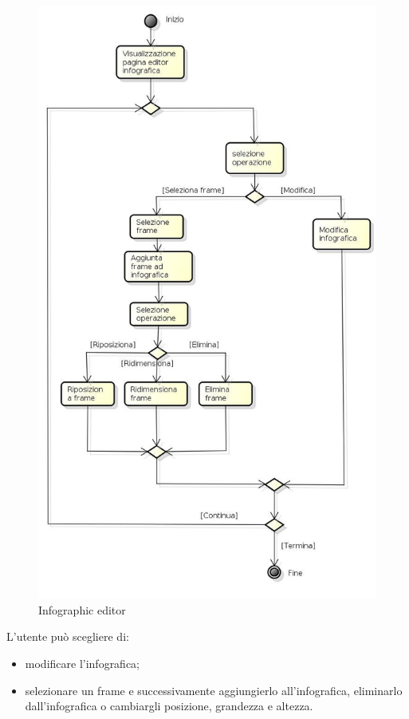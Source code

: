 \begin{figure}[h!]
		\centering
		\includegraphics[scale=.4]{img/Editor_infografica.jpg}
		\caption{Infographic editor}
		\label{fig:Infografica_editor}
\end{figure}

L'utente può scegliere di: 
\begin{itemize}
\item modificare l'infografica;
\item selezionare un frame e successivamente aggiungierlo all'infografica, eliminarlo dall'infografica o cambiargli posizione, grandezza e altezza.
\end{itemize}

